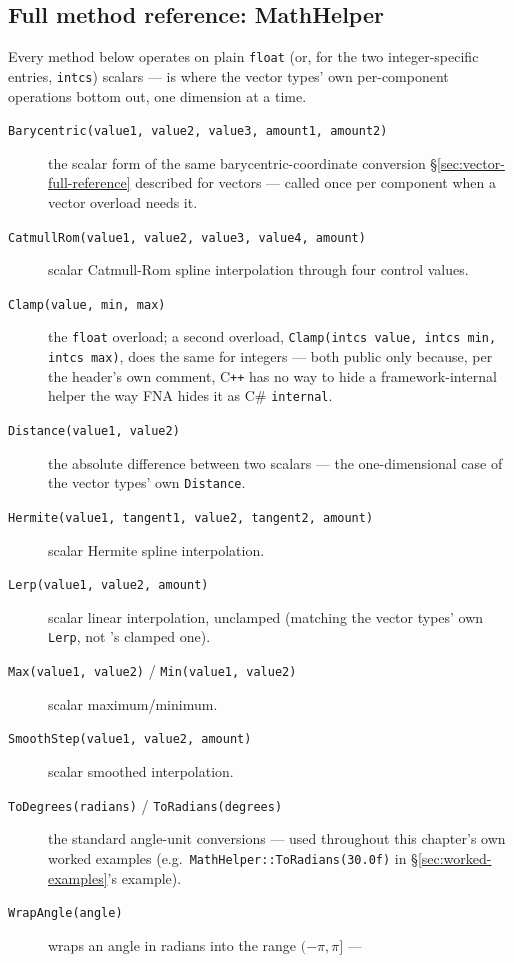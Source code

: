 \subsection{Full method reference: MathHelper}

Every method below operates on plain \texttt{float} (or, for the two integer-specific entries,
\texttt{intcs}) scalars ---  is where the vector types' own per-component
operations bottom out, one dimension at a time.

\begin{description}
\item[\texttt{Barycentric(value1, value2, value3, amount1, amount2)}] the scalar form of the
  same barycentric-coordinate conversion \S\ref{sec:vector-full-reference} described for
  vectors --- called once per component when a vector overload needs it.
\item[\texttt{CatmullRom(value1, value2, value3, value4, amount)}] scalar Catmull-Rom spline
  interpolation through four control values.
\item[\texttt{Clamp(value, min, max)}] the \texttt{float} overload; a second overload,
  \texttt{Clamp(intcs value, intcs min, intcs max)}, does the same for integers --- both public
  only because, per the header's own comment, C\texttt{++} has no way to hide a framework-internal
  helper the way FNA hides it as C\# \texttt{internal}.
\item[\texttt{Distance(value1, value2)}] the absolute difference between two scalars ---
  the one-dimensional case of the vector types' own \texttt{Distance}.
\item[\texttt{Hermite(value1, tangent1, value2, tangent2, amount)}] scalar Hermite spline
  interpolation.
\item[\texttt{Lerp(value1, value2, amount)}] scalar linear interpolation, unclamped (matching
  the vector types' own \texttt{Lerp}, not 's clamped one).
\item[\texttt{Max(value1, value2)} / \texttt{Min(value1, value2)}] scalar maximum/minimum.
\item[\texttt{SmoothStep(value1, value2, amount)}] scalar smoothed interpolation.
\item[\texttt{ToDegrees(radians)} / \texttt{ToRadians(degrees)}] the standard angle-unit
  conversions --- used throughout this chapter's own worked examples (e.g.\
  \texttt{MathHelper::ToRadians(30.0f)} in \S\ref{sec:worked-examples}'s 
  example).
\item[\texttt{WrapAngle(angle)}] wraps an angle in radians into the range $(-\pi, \pi]$ ---

\end{description}
